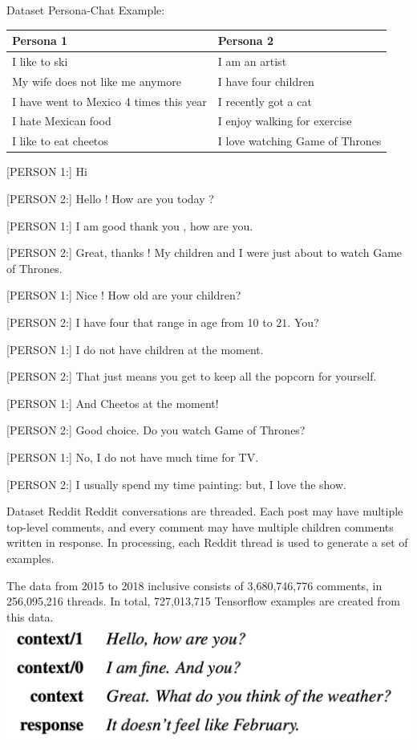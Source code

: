 \documentclass{beamer}
\begin{document}
\begin{frame}{Dataset Persona-Chat}
Example:
\begin{center}\tiny
\begin{tabular}{l|l}
\hline Persona 1 & Persona 2 \\
\hline I like to ski & I am an artist \\
My wife does not like me anymore & I have four children \\
I have went to Mexico 4 times this year & I recently got a cat \\
I hate Mexican food & I enjoy walking for exercise \\
I like to eat cheetos & I love watching Game of Thrones \\
\hline
\end{tabular}
\end{center}
\tiny
[PERSON 1:] Hi

[PERSON 2:] Hello ! How are you today ?

[PERSON 1:] I am good thank you , how are you.

[PERSON 2:] Great, thanks ! My children and I were just about to watch Game of Thrones.

[PERSON 1:] Nice ! How old are your children?

[PERSON 2:] I have four that range in age from 10 to $21 .$ You?

[PERSON 1:] I do not have children at the moment.

[PERSON 2:] That just means you get to keep all the popcorn for yourself.

[PERSON 1:] And Cheetos at the moment!

[PERSON 2:] Good choice. Do you watch Game of Thrones?

[PERSON 1:] No, I do not have much time for TV.

[PERSON 2:] I usually spend my time painting: but, I love the show.

\end{frame}

\begin{frame}{Dataset Reddit}
Reddit conversations are threaded. Each post may have multiple top-level comments, and every comment may have multiple children comments written in response. In processing, each Reddit thread is used to generate a set of examples.

The data from 2015 to 2018 inclusive consists of
3,680,746,776 comments, in 256,095,216 threads.
In total, 727,013,715 Tensorflow examples are created from this data.
\includegraphics[width=0.5\linewidth]{reddit.png}
\end{frame}
\end{document}
